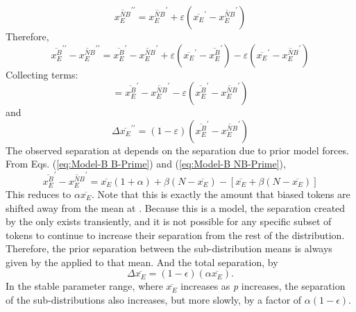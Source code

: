 \begin{equation}
\overline{x_{E}^{NB}}^{\prime\prime}=\overline{x_{E}^{NB}}^{\prime}+\varepsilon\left(\overline{x_{E}}^{\prime}-\overline{x_{E}^{NB}}^{\prime}\right)
\end{equation}
Therefore, 
\begin{equation}
\overline{x_{E}^{B}}^{\prime\prime}-\overline{x_{E}^{NB}}^{\prime\prime}=\overline{x_{E}^{B}}^{\prime}-\overline{x_{E}^{NB}}^{\prime}+\varepsilon\left(\overline{x_{E}}^{\prime}-\overline{x_{E}^{B}}^{\prime}\right)-\varepsilon\left(\overline{x_{E}}^{\prime}-\overline{x_{E}^{NB}}^{\prime}\right)
\end{equation}
Collecting terms:
\begin{equation}
=\overline{x_{E}^{B}}^{\prime}-\overline{x_{E}^{NB}}^{\prime}-\varepsilon\left(\overline{x_{E}^{B}}^{\prime}-\overline{x_{E}^{NB}}^{\prime}\right)
\end{equation}
and
\begin{equation}
\Delta\overline{x_{E}}^{\prime\prime}=(1-\varepsilon)\left(\overline{x_{E}^{B}}^{\prime}-\overline{x_{E}^{NB}}^{\prime}\right)
\end{equation}
The observed separation at  depends on the separation due
to prior model forces. From Eqs. (\ref{eq:Model-B B-Prime}) and (\ref{eq:Model-B NB-Prime}), 
\begin{equation}
\overline{x_{E}^{B}}^{\prime}-\overline{x_{E}^{NB}}^{\prime}=\overline{x_{E}}(1+\alpha)+\beta(N-\overline{x_{E}})-[\overline{x_{E}}+\beta(N-\overline{x_{E}})]
\end{equation}
This reduces to $\alpha\overline{x_{E}}$. Note that this is exactly
the amount that biased tokens are shifted away from the mean at .
Because this is a  model, the separation created by
the   only exists transiently, and it is not possible
for any specific subset of tokens to continue to increase their separation
from the rest of the distribution. Therefore, the prior separation
between the sub-distribution means is always given by the 
 applied to that mean. And the total separation, by 
\begin{equation}
\Delta\overline{x_{E}}=(1-\epsilon)(\alpha\overline{x_{E}}).\label{eq:Cat Sep-1}
\end{equation}
In the stable parameter range, where $\overline{x_{E}}$ increases
as \emph{p} increases, the separation of the sub-distributions also
increases, but more slowly, by a factor of $\alpha(1-\epsilon)$.

